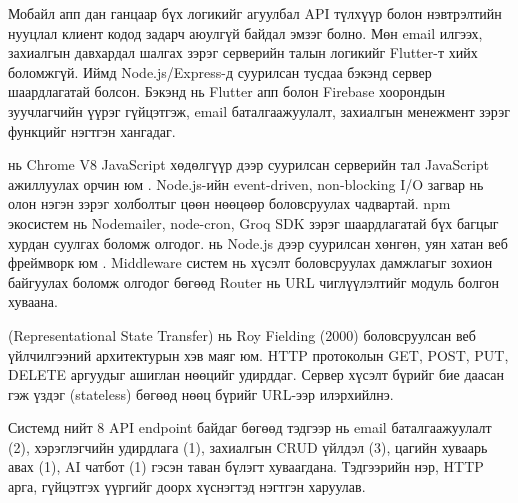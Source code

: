 \bigskip

Мобайл апп дан ганцаар бүх логикийг агуулбал API түлхүүр болон нэвтрэлтийн нууцлал клиент кодод задарч аюулгүй байдал эмзэг болно. Мөн email илгээх, захиалгын давхардал шалгах зэрэг серверийн талын логикийг Flutter-т хийх боломжгүй. Иймд Node.js/Express-д суурилсан тусдаа бэкэнд сервер шаардлагатай болсон. Бэкэнд нь Flutter апп болон Firebase хоорондын зуучлагчийн үүрэг гүйцэтгэж, email баталгаажуулалт, захиалгын менежмент зэрэг функцийг нэгтгэн хангадаг.

 нь Chrome V8 JavaScript хөдөлгүүр дээр суурилсан серверийн тал JavaScript ажиллуулах орчин юм \cite{nodejs_doc}. Node.js-ийн event-driven, non-blocking I/O загвар нь олон нэгэн зэрэг холболтыг цөөн нөөцөөр боловсруулах чадвартай. npm экосистем нь Nodemailer, node-cron, Groq SDK зэрэг шаардлагатай бүх багцыг хурдан суулгах боломж олгодог.  нь Node.js дээр суурилсан хөнгөн, уян хатан веб фреймворк юм \cite{expressjs_doc}. Middleware систем нь хүсэлт боловсруулах дамжлагыг зохион байгуулах боломж олгодог бөгөөд Router нь URL чиглүүлэлтийг модуль болгон хуваана.

 (Representational State Transfer) нь Roy Fielding (2000) \cite{rest_fielding} боловсруулсан веб үйлчилгээний архитектурын хэв маяг юм. HTTP протоколын GET, POST, PUT, DELETE аргуудыг ашиглан нөөцийг удирддаг. Сервер хүсэлт бүрийг бие даасан гэж үздэг (stateless) бөгөөд нөөц бүрийг URL-ээр илэрхийлнэ.

Системд нийт 8 API endpoint байдаг бөгөөд тэдгээр нь email баталгаажуулалт (2), хэрэглэгчийн удирдлага (1), захиалгын CRUD үйлдэл (3), цагийн хуваарь авах (1), AI чатбот (1) гэсэн таван бүлэгт хуваагдана. Тэдгээрийн нэр, HTTP арга, гүйцэтгэх үүргийг доорх хүснэгтэд нэгтгэн харуулав.


